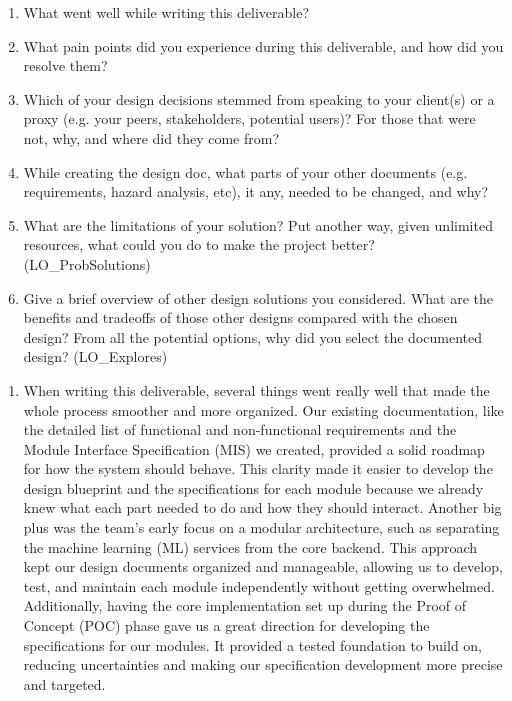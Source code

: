 \documentclass[12pt, titlepage]{article}
\begin{document}
\begin{enumerate}
  \item What went well while writing this deliverable? 
  \item What pain points did you experience during this deliverable, and how
    did you resolve them?
  \item Which of your design decisions stemmed from speaking to your client(s)
  or a proxy (e.g. your peers, stakeholders, potential users)? For those that
  were not, why, and where did they come from?
  \item While creating the design doc, what parts of your other documents (e.g.
  requirements, hazard analysis, etc), it any, needed to be changed, and why?
  \item What are the limitations of your solution?  Put another way, given
  unlimited resources, what could you do to make the project better? (LO\_ProbSolutions)
  \item Give a brief overview of other design solutions you considered.  What
  are the benefits and tradeoffs of those other designs compared with the chosen
  design?  From all the potential options, why did you select the documented design?
  (LO\_Explores)
\end{enumerate}

\newpage
\begin{enumerate}
    \item When writing this deliverable, several things went really well that made the whole process smoother and more organized. Our existing documentation, like the detailed list of functional and non-functional requirements and the Module Interface Specification (MIS) we created, provided a solid roadmap for how the system should behave. This clarity made it easier to develop the design blueprint and the specifications for each module because we already knew what each part needed to do and how they should interact. Another big plus was the team’s early focus on a modular architecture, such as separating the machine learning (ML) services from the core backend. This approach kept our design documents organized and manageable, allowing us to develop, test, and maintain each module independently without getting overwhelmed. Additionally, having the core implementation set up during the Proof of Concept (POC) phase gave us a great direction for developing the specifications for our modules. It provided a tested foundation to build on, reducing uncertainties and making our specification development more precise and targeted.
\end{enumerate}
\end{document}
